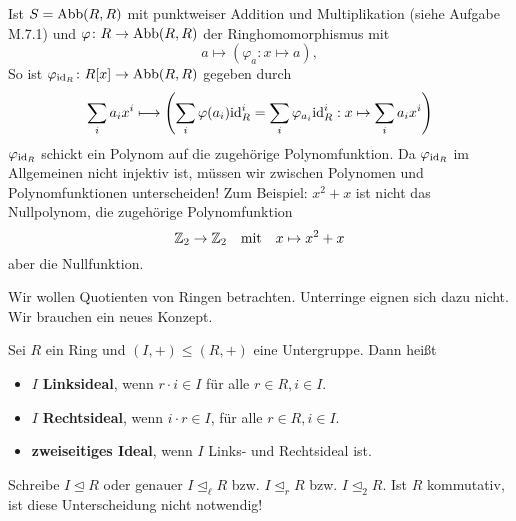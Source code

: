 \begin{beispiel}
\begin{enumerate}[label=(\arabic*)]
		Ist $S = \mathrm{Abb}(R,R)$ mit punktweiser Addition und Multiplikation (siehe Aufgabe M.7.1) und $\varphi \colon R \to \mathrm{Abb}(R,R)$ der Ringhomomorphismus mit
		\[a \mapsto (\varphi_a \colon x \mapsto a),\]
		So ist $\varphi_{\mathrm{id}_R} \colon R[x] \to \mathrm{Abb}(R,R)$ gegeben durch 
		\[\sum_i a_ix^i \longmapsto \left(\sum_i \varphi(a_i) \mathrm{id}_R^i = \sum_i \varphi_{a_i} \mathrm{id}_R^i : x \mapsto \sum_i a_i x^i\right)\]
		$\varphi_{\mathrm{id}_R}$ schickt ein Polynom auf die zugehörige Polynomfunktion. Da $\varphi_{\mathrm{id}_R}$ im Allgemeinen nicht injektiv ist, müssen wir zwischen Polynomen und Polynomfunktionen unterscheiden! Zum Beispiel: $x^2 + x$ ist nicht das Nullpolynom, die zugehörige Polynomfunktion 
		\[\mathbb{Z}_2 \to \mathbb{Z}_2 \quad\text{mit}\quad x \mapsto x^2 + x\]
		aber die Nullfunktion.
	\end{enumerate}
\end{beispiel}
\begin{leftbar}
	Wir wollen Quotienten von Ringen betrachten. Unterringe eignen sich dazu nicht. Wir brauchen ein neues Konzept.
\end{leftbar}
\begin{definition}
	Sei $R$ ein Ring und $(I,+) \leq (R,+)$ eine Untergruppe. Dann heißt
	\begin{itemize}
		\item $I$ \textbf{Linksideal}, wenn $r \cdot i \in I$ für alle $r \in R, i \in I$.
		\item $I$ \textbf{Rechtsideal}, wenn $i \cdot r \in I$, für alle $r \in R, i \in I$.
		\item \textbf{zweiseitiges Ideal}, wenn $I$ Links- und Rechtsideal ist.
	\end{itemize}
	Schreibe $I \unlhd R$ oder genauer $I \unlhd_\ell R$ bzw. $I \unlhd_r R$ bzw. $I \unlhd_2 R$. Ist $R$ kommutativ, ist diese Unterscheidung nicht notwendig! 
\end{definition}
